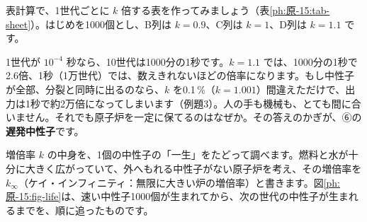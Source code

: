 表計算で、1世代ごとに $k$ 倍する表を作ってみましょう（表\ref{ph:原-15:tab-sheet}）。はじめを1000個とし、B列は $k=0.9$、C列は $k=1$、D列は $k=1.1$ です。

\begin{bkcenter}
\label{ph:原-15:tab-sheet}
\end{bkcenter}

1世代が $10^{-4}$ 秒なら、10世代は1000分の1秒です。$k=1.1$ では、1000分の1秒で2.6倍、1秒（1万世代）では、数えきれないほどの倍率になります。もし中性子が全部、分裂と同時に出るのなら、$k$ を0.1\,\%（$k=1.001$）間違えただけで、出力は1秒で約2万倍になってしまいます（例題3）。人の手も機械も、とても間に合いません。それでも原子炉を一定に保てるのはなぜか。その答えのかぎが、⑥の\textbf{遅発中性子}です。

\label{ph:原-15:sec5}
増倍率 $k$ の中身を、1個の中性子の「一生」をたどって調べます。燃料と水が十分に大きく広がっていて、外へもれる中性子がない原子炉を考え、その増倍率を $k_\infty$（ケイ・インフィニティ：無限に大きい炉の増倍率）と書きます。図\ref{ph:原-15:fig-life}は、速い中性子1000個が生まれてから、次の世代の中性子が生まれるまでを、順に追ったものです。


